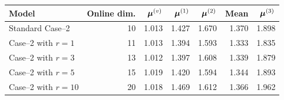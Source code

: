 \begin{tabular}{lrrrrrr}
\toprule
Model & Online dim. & $\bm\mu^{(v)}$ & $\bm\mu^{(1)}$ & $\bm\mu^{(2)}$ & Mean & $\bm\mu^{(3)}$ \\
\midrule
Standard Case--2 & 10 & 1.013 & 1.427 & 1.670 & 1.370 & 1.898 \\
Case--2 with $r=1$ & 11 & 1.013 & 1.394 & 1.593 & 1.333 & 1.835 \\
Case--2 with $r=3$ & 13 & 1.012 & 1.397 & 1.608 & 1.339 & 1.879 \\
Case--2 with $r=5$ & 15 & 1.019 & 1.420 & 1.594 & 1.344 & 1.893 \\
Case--2 with $r=10$ & 20 & 1.018 & 1.469 & 1.612 & 1.366 & 1.962 \\
\bottomrule
\end{tabular}
